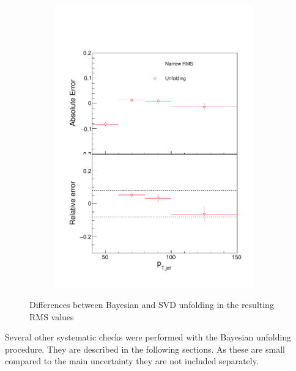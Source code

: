\begin{figure}
\begin{subfigure}{0.44\textwidth}
\end{subfigure}
\begin{subfigure}{0.44\textwidth}
\includegraphics[width=0.95\textwidth]{results/SystematicErrors/SystematicErrorsGausRMS_UnfNFin00JetPt08_linx_data}
\end{subfigure}
\caption{Differences between Bayesian and SVD unfolding in the resulting RMS values}
\label{fig:systunf}
\end{figure}

Several other systematic checks were performed with the Bayesian unfolding procedure. They are described in the following sections. As these are small compared to the main uncertainty they are not included separately.
 
  
